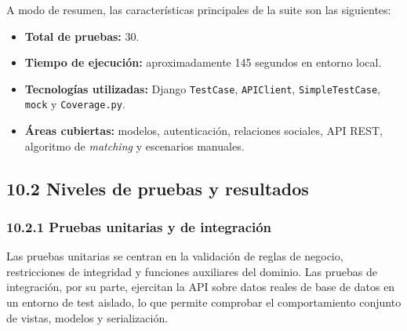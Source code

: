 A modo de resumen, las características principales de la suite son las siguientes:

\begin{itemize}
    \item \textbf{Total de pruebas:} 30.
    \item \textbf{Tiempo de ejecución:} aproximadamente 145 segundos en entorno local.
    \item \textbf{Tecnologías utilizadas:} Django \texttt{TestCase}, \texttt{APIClient}, \texttt{SimpleTestCase}, \texttt{mock} y \texttt{Coverage.py}.
    \item \textbf{Áreas cubiertas:} modelos, autenticación, relaciones sociales, API REST, algoritmo de \textit{matching} y escenarios manuales.
\end{itemize}


\subsection{10.2 Niveles de pruebas y resultados}
\label{sec:niveles-pruebas}


\subsubsection{10.2.1 Pruebas unitarias y de integración}
\label{subsec:pruebas-unitarias-integracion}

Las pruebas unitarias se centran en la validación de reglas de negocio, restricciones de integridad y funciones auxiliares del dominio. Las pruebas de integración, por su parte, ejercitan la API sobre datos reales de base de datos en un entorno de test aislado, lo que permite comprobar el comportamiento conjunto de vistas, modelos y serialización.

